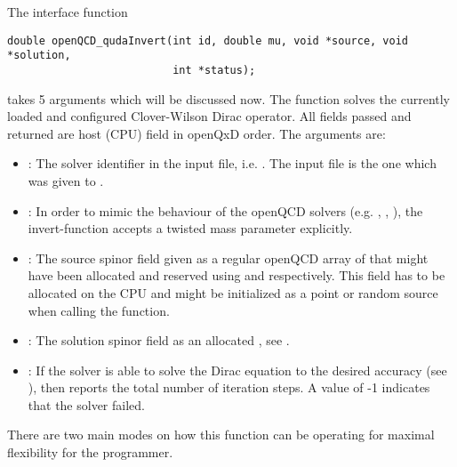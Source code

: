 The interface function
\begin{verbatim}
double openQCD_qudaInvert(int id, double mu, void *source, void *solution,
                          int *status);
\end{verbatim}
takes 5 arguments which will be discussed now. The function solves the currently loaded and configured Clover-Wilson Dirac operator. All fields passed and returned are host (CPU) field in openQxD order. The arguments are:
\begin{itemize}
  \item {}: The solver identifier in the input file, i.e. . The input file is the one which was given to .
  \item {}: In order to mimic the behaviour of the openQCD solvers (e.g. , , ), the invert-function accepts a twisted mass parameter  explicitly.
  \item {}: The source spinor field given as a regular openQCD array of  that might have been allocated and reserved using  and  respectively. This field has to be allocated on the CPU and might be initialized as a point or random source when calling the function.
  \item {}: The solution spinor field as an allocated , see .
  \item {}: If the solver is able to solve the Dirac equation to the desired accuracy (see ), then  reports the total number of iteration steps. A value of -1 indicates that the solver failed.
\end{itemize}

There are two main modes on how this function can be operating for maximal flexibility for the programmer.

